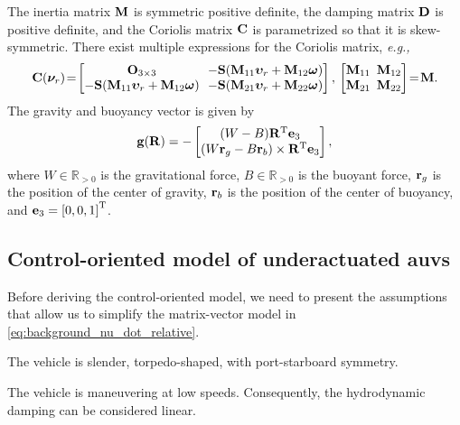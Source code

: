 The inertia matrix $\mathbf{M}$ is symmetric positive definite, the damping matrix $\mathbf{D}$ is positive definite, and the Coriolis matrix $\mathbf{C}$ is parametrized so that it is skew-symmetric.
There exist multiple expressions for the Coriolis matrix, \emph{e.g.,}
\begin{equation}
    \label{eq:background_coriolis}
    \mat{C}(\vel_r)\! =\!
    \begin{bmatrix}
        \mat{O}_{3 \times 3} & \!\!-\mat{S}(\mat{M}_{11}\bvel_r + \mat{M}_{12}\bs{\omega}) \\
        -\mat{S}(\mat{M}_{11}\bvel_r + \mat{M}_{12}\bs{\omega}) & \!\!-\mat{S}(\mat{M}_{21}\bvel_r + \mat{M}_{22}\bs{\omega})
    \end{bmatrix}, \,
    \begin{bmatrix}
        \mat{M}_{11} & \!\!\!\mat{M}_{12} \\ \mat{M}_{21} & \!\!\!\mat{M}_{22}
    \end{bmatrix}\!
    = \!\mat{M}.
\end{equation}
The gravity and buoyancy vector is given by \cite{fossen_handbook_2011}
\begin{equation}
    \mathbf{g}(\mathbf{R}) = -
    \begin{bmatrix}
        (W - B) \mathbf{R}^{\mathrm{T}} \mathbf{e}_3 \\
        (W\mathbf{r}_g - B\mathbf{r}_b) \times \mathbf{R}^{\mathrm{T}} \mathbf{e}_3
    \end{bmatrix},
\end{equation}
where $W \in \mathbb{R}_{> 0}$ is the gravitational force, $B \in \mathbb{R}_{> 0}$ is the buoyant force, $\mathbf{r}_g$ is the position of the center of gravity, $\mathbf{r}_b$ is the position of the center of buoyancy, and $\mathbf{e}_3 = \left[0, 0, 1\right]^{\mathrm{T}}$.

\subsection{Control-oriented model of underactuated \glspl{auv}}
\label{sec:model_control_oriented}
Before deriving the control-oriented model, we need to present the assumptions that allow us to simplify the matrix-vector model in \eqref{eq:background_nu_dot_relative}.

\begin{asm}
    \label{asm:symmetric}
    The vehicle is slender, torpedo-shaped, with port-starboard symmetry.
\end{asm}

\begin{asm}
    \label{asm:damping}
    The vehicle is maneuvering at low speeds.
    Consequently, the hydrodynamic damping can be considered linear.
\end{asm}

